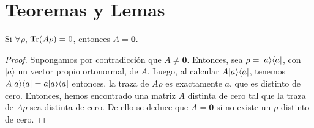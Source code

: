 \section{Teoremas y Lemas}
\begin{lemma}\label{lemma_traza_cero} Si $\forall\rho$, ${\rm Tr}(A\rho)=0$, entonces $A=\mathbf{0}$.\end{lemma}\begin{proof} Supongamos por contradicción que $A\ne \mathbf{0}$. Entonces, sea $\rho=|a\rangle \langle a|$, con $|a\rangle$ un vector propio ortonormal, de $A$. Luego, al calcular $A|a\rangle \langle a|$, tenemos $A|a\rangle \langle a|=a|a\rangle \langle a|$ entonces, la traza  de $A\rho$ es exactamente $a$, que es distinto de cero.
Entonces, hemos encontrado una matriz $A$ distinta de cero tal que la traza de $A\rho$ sea distinta de cero. De ello se deduce que $A = \mathbf{0}$ si no existe un $\rho$ distinto de cero.\end{proof}
 
\begin{comment}
\section{Prueba de las características de los efectos propuestos}

\begin{enumerate}
    \item Son operadores hermíticos\[{\left(\sum_{\Pi \in S} p_\Pi \Pi(P_{\lambda_i})\right)}^\dagger =\sum_{\Pi \in S} p_\Pi {\left(\Pi(P_{\lambda_i})\right)}^\dagger = \sum_{\Pi \in S} p_\Pi \Pi(P_{\lambda_i}).\]
    \item Cumplen con la ecuación de completitud \[\sum_{\lambda_i \in \Lambda}\sum_{\Pi \in S} p_\Pi \Pi(P_{\lambda_i})=\]
\end{enumerate}
\end{comment}